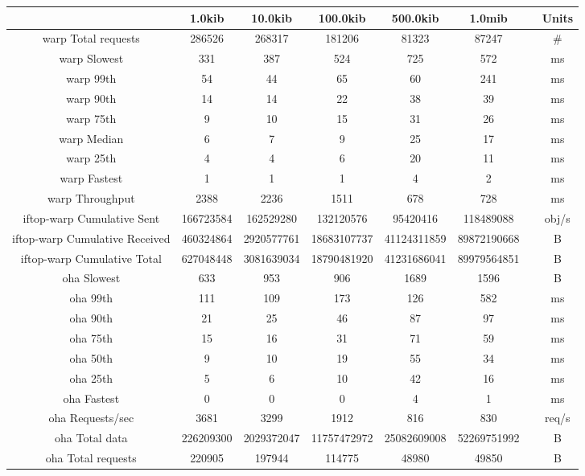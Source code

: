 \begin{sidewaystable}
	\begin{tabular}{|c|c|c|c|c|c|c|c|}
		\hline
		& 1.0kib & 10.0kib & 100.0kib & 500.0kib & 1.0mib &  & Units \\
		\hline
		warp Total requests & 286526 & 268317 & 181206 & 81323 & 87247 &  & \# \\
		\hline
		warp Slowest & 331 & 387 & 524 & 725 & 572 &  & ms \\
		\hline
		warp 99th & 54 & 44 & 65 & 60 & 241 &  & ms \\
		\hline
		warp 90th & 14 & 14 & 22 & 38 & 39 &  & ms \\
		\hline
		warp 75th & 9 & 10 & 15 & 31 & 26 &  & ms \\
		\hline
		warp Median & 6 & 7 & 9 & 25 & 17 &  & ms \\
		\hline
		warp 25th & 4 & 4 & 6 & 20 & 11 &  & ms \\
		\hline
		warp Fastest & 1 & 1 & 1 & 4 & 2 &  & ms \\
		\hline
		warp Throughput & 2388 & 2236 & 1511 & 678 & 728 &  & ms \\
		\hline
		iftop-warp Cumulative Sent & 166723584 & 162529280 & 132120576 & 95420416 & 118489088 &  & obj/s \\
		\hline
		iftop-warp Cumulative Received & 460324864 & 2920577761 & 18683107737 & 41124311859 & 89872190668 &  & B \\
		\hline
		iftop-warp Cumulative Total & 627048448 & 3081639034 & 18790481920 & 41231686041 & 89979564851 &  & B \\
		\hline
		oha Slowest & 633 & 953 & 906 & 1689 & 1596 &  & B \\
		\hline
		oha 99th & 111 & 109 & 173 & 126 & 582 &  & ms \\
		\hline
		oha 90th & 21 & 25 & 46 & 87 & 97 &  & ms \\
		\hline
		oha 75th & 15 & 16 & 31 & 71 & 59 &  & ms \\
		\hline
		oha 50th & 9 & 10 & 19 & 55 & 34 &  & ms \\
		\hline
		oha 25th & 5 & 6 & 10 & 42 & 16 &  & ms \\
		\hline
		oha Fastest & 0 & 0 & 0 & 4 & 1 &  & ms \\
		\hline
		oha Requests/sec & 3681 & 3299 & 1912 & 816 & 830 &  & req/s \\
		\hline
		oha Total data & 226209300 & 2029372047 & 11757472972 & 25082609008 & 52269751992 &  & B \\
		\hline
		oha Total requests & 220905 & 197944 & 114775 & 48980 & 49850 &  & B \\

\end{tabular}
\end{sidewaystable}

